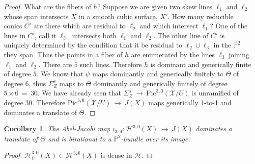 \documentclass[twoside,12pt,reqno]{amsart}
\theoremstyle{plain}
\newtheorem{cor}[thm]{Corollary}
\theoremstyle{definition}
\newcommand{\Hdg}[2]{\mathcal{H}^{#1,#2}}
\newcommand{\PP}{\mathbb{P}}
\def\ps{\vspace{4pt}}
\begin{document}
\begin{proof}
\ps

What are the fibers of $h$?  Suppose we are
given two skew lines $\ell_1$ and $\ell_2$ whose span intersects $X$ in a smooth
cubic surface, $X'$.  How many reducible conics $C'$ are there which are
residual to $\ell_2$ and which intersect $\ell_1$?  One of the lines in $C'$,
call it $\ell_3$, intersects both $\ell_1$ and $\ell_2$.  The other line of
$C'$ is uniquely determined by the condition that it be residual to
$\ell_2\cup \ell_3$ in the $\PP^2$ they span.  Thus the points in a fiber 
of $h$ are 
enumerated by the lines $\ell_3$ joining $\ell_1$ and $\ell_2$.  There are $5$ such
lines.  Therefore $h$ is dominant and generically finite of degree $5$.  
We know that 
$\psi$ maps dominantly and generically finitely to $\Theta$ of degree $6$,
thus $\Sigma_Z^{s}$ maps to $\Theta$ dominantly and generically finitely of
degree $5\times 6~=~30$.  We have already seen that
$\Sigma_Z^s~\rightarrow~ \text{Pic}^{3,0}(\mathcal{X}/U)$ is unramified of degree $30$.
Therefore $\text{Pic}^{3,0}(\mathcal{X}/U)~\rightarrow~ J(X)$ maps generically 1-to-1
and dominates a translate of $\Theta$.
\end{proof} 

\ps

\begin{cor}\label{cor-aj30}  The Abel-Jacobi map
$i_{3,0}:\Hdg{3}{0}(X)~\rightarrow~ J(X)$ dominates a translate of
$\Theta$ and is birational to a $\PP^2$-bundle over its image.
\end{cor}

\begin{proof}  $\mathcal{H}_U^{3,0}(X)\subset \mathcal{H}^{3,0}(X)$ is dense 
in $\overline{\mathcal{H}}$.
\end{proof}
\end{document}
